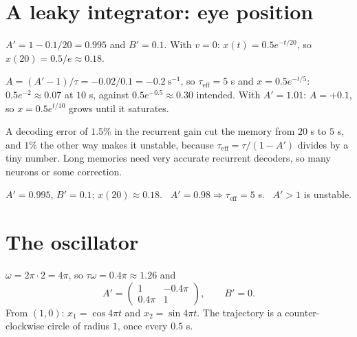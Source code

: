 \documentclass[11pt,letterpaper]{article}
\newcommand{\ans}[1]{\par\vspace{4pt}{\bfseries #1}\quad}
\begin{document}
\section{A leaky integrator: eye position}

\ans{Q1}
$A' = 1 - 0.1/20 = 0.995$ and $B' = 0.1$. With $v = 0$: $x(t) = 0.5e^{-t/20}$, so $x(20) = 0.5/e \approx 0.18$.

\ans{Q2}
$A = (A' - 1)/\tau = -0.02/0.1 = -0.2\ \mathrm{s^{-1}}$, so $\tau_{\mathrm{eff}} = 5$ s and $x = 0.5e^{-t/5}$: $0.5e^{-2} \approx 0.07$ at $10$ s, against $0.5e^{-0.5} \approx 0.30$ intended.
With $A' = 1.01$: $A = +0.1$, so $x = 0.5e^{t/10}$ grows until it saturates.

A decoding error of $1.5\%$ in the recurrent gain cut the memory from $20$ s to $5$ s, and $1\%$ the other way makes it unstable, because $\tau_{\mathrm{eff}} = \tau/(1 - A')$ divides by a tiny number. Long memories need very accurate recurrent decoders, so many neurons or some correction.
\begin{center}
\end{center}
\begin{result}
$A' = 0.995$, $B' = 0.1$; $x(20) \approx 0.18$. \ $A' = 0.98 \Rightarrow \tau_{\mathrm{eff}} = 5$ s. \ $A' > 1$ is unstable.
\end{result}

\section{The oscillator}

\ans{Q1}
$\omega = 2\pi\cdot 2 = 4\pi$, so $\tau\omega = 0.4\pi \approx 1.26$ and
\[
A' = \begin{pmatrix} 1 & -0.4\pi \\ 0.4\pi & 1 \end{pmatrix}, \qquad B' = 0.
\]
From $(1, 0)$: $x_1 = \cos 4\pi t$ and $x_2 = \sin 4\pi t$. The trajectory is a counter-clockwise circle of radius $1$, once every $0.5$ s.
\end{document}
